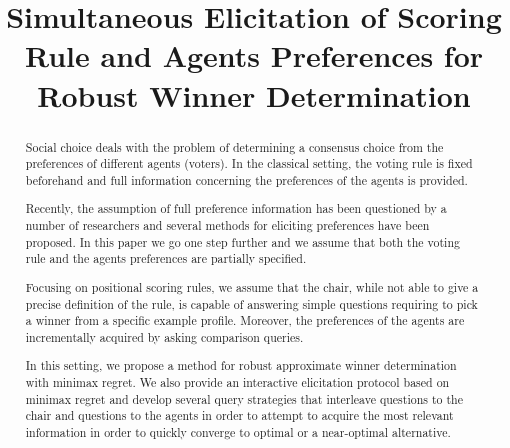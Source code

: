\newrelation{\prefinc}{\!\parallel\!}%

\newcommand{\profile}{\bm{v}}%
\newcommand{\pprofile}{{\bm{p}}}%
\newcommand{\w}{\bm{w}}
\newcommand{\W}{\mathcal{W}}
\newcommand{\Co}{\mathcal{C}}
\newcommand{\pw}{W}%
\newcommand{\powersetz}[1]{\mathscr{P}^*(#1)}
\newcommand{\strat}[1]{\emph{#1}}

\DeclareMathOperator{\Regret}{Regret}
\DeclareMathOperator{\SCORE}{Score}
\DeclareMathOperator{\PMR}{PMR}
\DeclareMathOperator{\MR}{MR}
\DeclareMathOperator{\MMR}{MMR}
\DeclareMathOperator{\leximax}{leximax}
\DeclareMathOperator*{\argmax}{argmax}
\DeclareMathOperator*{\argmin}{argmin}

\newtheorem{claim}{Claim}
\newtheorem{prop}{Proposition}
\newtheorem{corollary}{Corollary}
\newtheorem{definition}{Definition}
\newtheorem{example}{Example}

\DeclarePairedDelimiter\set{\{}{\}}
\DeclarePairedDelimiter\card{\lvert}{\rvert}
\DeclarePairedDelimiter\abs{\lvert}{\rvert}

\hfuzz=1cm

\title{Simultaneous Elicitation of Scoring Rule and Agents Preferences for Robust Winner Determination}


\maketitle
\begin{abstract}
Social choice deals with the problem of determining a consensus choice from the preferences of different agents (voters).
In the classical setting, the voting rule is fixed beforehand and full information concerning the preferences of the agents is provided.

Recently, the assumption of full preference information has been questioned by a number of researchers and several methods for eliciting preferences have been proposed.
In this paper we go one step further and we assume that both the voting rule and the agents preferences are partially specified.

Focusing on positional scoring rules, we assume that the chair, while  not able to give a precise definition of the rule, is capable of answering simple questions  requiring to pick a winner from a specific  example profile.
Moreover, the preferences of the agents are incrementally acquired by asking comparison queries.

In this setting, we propose a method  for robust approximate winner determination with minimax regret. 
We also provide an interactive elicitation protocol based on minimax regret
and develop several query strategies that interleave questions to the chair and questions to the agents in order to attempt to acquire the most relevant information in order to quickly converge to optimal or a near-optimal alternative.
\end{abstract}

